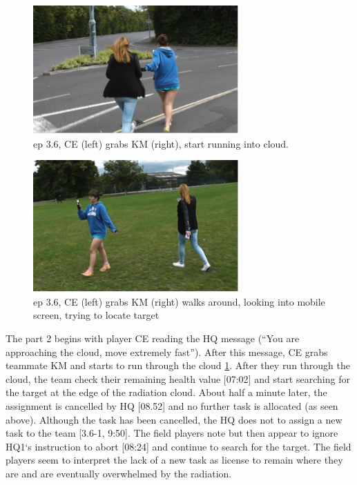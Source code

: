 \begin{figure}[h]
\centering

\includegraphics[width=0.7\textwidth]{img/study3/ep361}
\caption{ep 3.6, CE (left) grabs KM (right), start running into cloud. }
\label{fig:ep361}
\end{figure}

\begin{figure}[h]
\centering
 \includegraphics[width=0.7\textwidth]{img/study3/ep362}
\caption{ep 3.6, CE (left) grabs KM (right) walks around, looking into mobile screen, trying to locate target}
\label{fig:ep362}

\end{figure}

The part 2 begins with player CE reading the HQ message (``You are approaching the cloud, move extremely fast''). After this message, CE grabs teammate KM and starts to run through the cloud \ref{fig:ep361}.  After they run through the cloud, the team check their remaining health value [07:02] and start searching for the target at the edge of the radiation cloud. About half a minute later, the assignment is cancelled by HQ [08.52] and no further task is allocated (as seen above). Although the task has been cancelled, the HQ does not to assign a new task to the team [3.6-1, 9:50]. The field players note but then appear to ignore HQ1`s instruction to abort [08:24] and continue to search for the target. The field players seem to interpret the lack of a new task as license to remain where they are and are eventually overwhelmed by the radiation.\\

